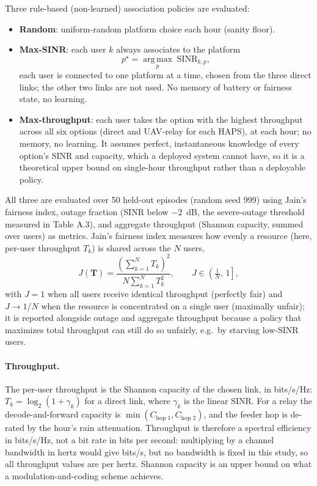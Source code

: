 \documentclass[conference]{IEEEtran}
\begin{document}
Three rule-based (non-learned) association policies are evaluated:
\begin{itemize}\setlength{\itemsep}{0pt}
  \item \textbf{Random}: uniform-random platform choice each hour (sanity floor).
  \item \textbf{Max-SINR}: each user $k$ always associates to the platform
    \begin{equation}
    p^\star = \operatorname*{arg\,max}_{p} \; \mathrm{SINR}_{k,p},
    \end{equation}
    each user is connected to one platform at a time, chosen from the three direct links; the other two links are not used. No memory of battery or fairness state, no learning.
  \item \textbf{Max-throughput}: each user takes the option with the highest throughput across all six options (direct and UAV-relay for each HAPS), at each hour; no memory, no learning. It assumes perfect, instantaneous knowledge of every option's SINR and capacity, which a deployed system cannot have, so it is a theoretical upper bound on single-hour throughput rather than a deployable policy.
\end{itemize}
All three are evaluated over 50 held-out episodes (random seed 999) using Jain's fairness index,
outage fraction (SINR below $-2$~dB, the severe-outage threshold measured in
Table A.3), and aggregate throughput (Shannon capacity, summed over
users) as metrics. Jain's fairness index measures how evenly a resource (here,
per-user throughput $T_k$) is shared across the $N$ users,
\begin{equation}
J(\mathbf{T}) = \frac{\left(\sum_{k=1}^{N} T_k\right)^2}{N \sum_{k=1}^{N} T_k^2},
\qquad J \in \left(\tfrac{1}{N},\,1\right],
\end{equation}
with $J=1$ when all users receive identical throughput (perfectly fair) and $J\to 1/N$
when the resource is concentrated on a single user (maximally unfair); it is reported
alongside outage and aggregate throughput because a policy that maximizes total
throughput can still do so unfairly, e.g.\ by starving low-SINR users.

\paragraph{Throughput.} The per-user throughput is the Shannon capacity of the chosen link, in bits/s/Hz: $T_k=\log_2(1+\gamma_k)$ for a direct link, where $\gamma_k$ is the linear SINR. For a relay the decode-and-forward capacity is $\min(C_{\text{hop 1}},C_{\text{hop 2}})$, and the feeder hop is de-rated by the hour's rain attenuation. Throughput is therefore a spectral efficiency in bits/s/Hz, not a bit rate in bits per second: multiplying by a channel bandwidth in hertz would give bits/s, but no bandwidth is fixed in this study, so all throughput values are per hertz. Shannon capacity is an upper bound on what a modulation-and-coding scheme achieves.
\end{document}
